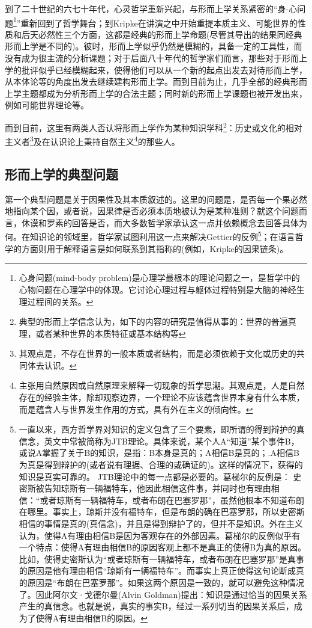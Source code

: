 \documentclass{article}
\begin{document}
到了二十世纪的六七十年代，心灵哲学重新兴起，与形而上学关系紧密的“身-心问题\footnote{心身问题(mind-body problem)是心理学最根本的理论问题之一，是哲学中的心物问题在心理学中的体现。它讨论心理过程与躯体过程特别是大脑的神经生理过程间的关系。}”重新回到了哲学舞台；到Kripke在讲演之中开始重提本质主义、可能世界的性质和后天必然性三个方面，这都是经典的形而上学命题(尽管其导出的结果同经典形而上学是不同的)。彼时，形而上学似乎仍然是模糊的，具备一定的工具性，而没有成为很主流的分析课题；对于后面八十年代的哲学家们而言，那些对于形而上学的批评似乎已经模糊起来，使得他们可以从一个新的起点出发去对待形而上学，从本体论等的角度出发去继续建构形而上学。而到目前为止，几乎全部的经典形而上学主题都成为分析形而上学的合法主题；同时新的形而上学课题也被开发出来，例如可能世界理论等。

而到目前，这里有两类人否认将形而上学作为某种知识学科\footnote{典型的形而上学信念认为，如下的内容的研究是值得从事的：世界的普遍真理，或者某种世界的本质特征或基本结构等}：历史或文化的相对主义者\footnote{其观点是，不存在世界的一般本质或者结构，而是必须依赖于文化或历史的共同体去认识。}及在认识论上秉持自然主义\footnote{主张用自然原因或自然原理来解释一切现象的哲学思潮。其观点是，人是自然存在的经验主体，除却观察边界，一个理论不应该蕴含世界本身有什么本质，而是蕴含人与世界发生作用的方式，具有外在主义的倾向性。}的那些人。
\subsection{形而上学的典型问题}
第一个典型问题是关于因果性及其本质叙述的。这里的问题是，是否每一个果必然地指向某个因，或者说，因果律是否必须本质地被认为是某种准则？就这个问题而言，休谟和罗素的回答是否，而大多数哲学家承认这一点并依赖概念去回答具体为何。在知识论的领域里，哲学家试图利用这一点来解决Gettier的反例\footnote{一直以来，西方哲学界对知识的定义包含了三个要素，即所谓的得到辩护的真信念，英文中常被简称为JTB理论。具体来说，某个人A“知道”某个事件B，或说A掌握了关于B的知识，是指：B本身是真的；A相信B是真的；.A相信B为真是得到辩护的(或者说有理据、合理的或确证的)。这样的情况下，获得的知识是真实可靠的。
JTB理论中的每一点都是必要的。葛梯尔的反例是：
史密斯被告知琼斯有一辆福特车，他因此相信这件事，并同时也有理由相信：“或者琼斯有一辆福特车，或者布朗在巴塞罗那”，虽然他根本不知道布朗在哪里。事实上，琼斯并没有福特车，但是布朗的确在巴塞罗那，所以史密斯相信的事情是真的(真信念)，并且是得到辩护了的，但并不是知识。外在主义认为，使得A有理由相信B是因为客观存在的外部因素。葛梯尔的反例似乎有一个特点：使得A有理由相信B的原因客观上都不是真正的使得B为真的原因。比如，使得史密斯认为“或者琼斯有一辆福特车，或者布朗在巴塞罗那”是真事的原因是他有理由相信“琼斯有一辆福特车”。而事实上真正使得这句论断成真的原因是“布朗在巴塞罗那”。如果这两个原因是一致的，就可以避免这种情况了。因此阿尔文·戈德尔曼(Alvin Goldman)提出：知识是通过恰当的因果关系产生的真信念。也就是说，真实的事实B，经过一系列切当的因果关系后，成为了使得A有理由相信B的原因。}；在语言哲学的方面则用于解释语言是如何联系到其指称的(例如，Kripke的因果链条)。
\end{document}

